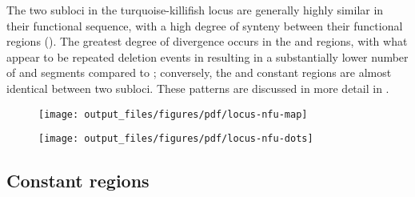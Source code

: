 The two subloci in the turquoise-killifish locus are generally highly similar in their functional sequence, with a high degree of synteny between their functional regions (). The greatest degree of divergence occurs in the \vh and \dh regions, with what appear to be repeated deletion events in  resulting in a substantially lower number of \vh and \dh segments compared to ; conversely, the \jh and constant regions are almost identical between two subloci. These patterns are discussed in more detail in .
	
\begin{figure}
	\centering
	\texttt{[image: output\_files/figures/pdf/locus-nfu-map]}
			    \begin{subfigure}{0em}
        \label{fig:nfu-locus-map-a}
    \end{subfigure}
    \begin{subfigure}{0em}
        \label{fig:nfu-locus-map-b}
    \end{subfigure}
    \begin{subfigure}{0em}
        \label{fig:nfu-locus-map-c}
        \end{subfigure}
	\label{fig:nfu-locus-map}
	\end{figure}
	
\begin{figure}
	\centering
	\texttt{[image: output\_files/figures/pdf/locus-nfu-dots]}
	\label{fig:nfu-locus-synteny}
\end{figure}
	
	\subsection{Constant regions}
	\label{sec:nfu-locus-constant}
	
